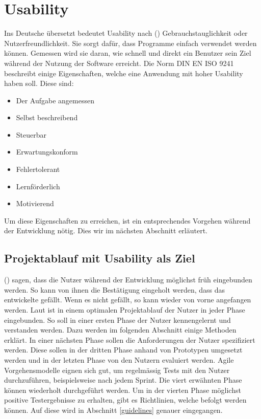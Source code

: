 \section{Usability}
Ins Deutsche übersetzt bedeutet Usability nach \citeauthor{usability} (\citeyear{usability}) Gebrauchstauglichkeit oder Nutzerfreundlichkeit.
Sie sorgt dafür, dass Programme einfach verwendet werden können.
Gemessen wird sie daran, wie schnell und direkt ein Benutzer sein Ziel während der Nutzung der Software erreicht.
Die Norm DIN EN ISO 9241 beschreibt einige Eigenschaften, welche eine Anwendung mit hoher Usability haben soll.
Diese sind:
\begin{itemize}
   \item Der Aufgabe angemessen
   \item Selbst beschreibend
   \item Steuerbar
   \item Erwartungskonform
   \item Fehlertolerant
   \item Lernförderlich
   \item Motivierend
\end{itemize}
Um diese Eigenschaften zu erreichen, ist ein entsprechendes Vorgehen während der Entwicklung nötig.
Dies wir im nächsten Abschnitt erläutert.


\subsection{Projektablauf mit Usability als Ziel}
\citeauthor{usability} (\citeyear{usability}) sagen, dass die Nutzer während der Entwicklung möglichst früh eingebunden werden.
So kann von ihnen die Bestätigung eingeholt werden, dass das entwickelte gefällt.
Wenn es nicht gefällt, so kann wieder von vorne angefangen werden.
Laut \citeauthor{usability} ist in einem optimalen Projektablauf der Nutzer in jeder Phase eingebunden.
So soll in einer ersten Phase der Nutzer kennengelernt und verstanden werden.
Dazu werden im folgenden Abschnitt einige Methoden erklärt.
In einer nächsten Phase sollen die Anforderungen der Nutzer spezifiziert werden.
Diese sollen in der dritten Phase anhand von Prototypen umgesetzt werden und in der letzten Phase von den Nutzern evaluiert werden.
Agile Vorgehensmodelle eignen sich gut, um regelmässig Tests mit den Nutzer durchzuführen, beispielsweise nach jedem Sprint.
Die viert erwähnten Phase können wiederholt durchgeführt werden.
Um in der vierten Phase möglichst positive Testergebnisse zu erhalten, gibt es Richtlinien, welche befolgt werden können.
Auf diese wird in Abschnitt \ref{guidelines} genauer eingegangen.


